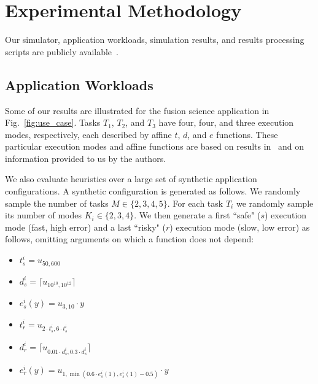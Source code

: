 \chapter{Experimental Methodology}
\label{sec:methodology}

Our simulator, application workloads, simulation results, and results processing scripts are publicly available~\cite{HIDDEN_URL}.




\section{Application Workloads}

Some of our results are illustrated for the fusion
science application in Fig.~\ref{fig:use_case}. Tasks
$T_1$, $T_2$, and $T_3$ have four, four, and three execution modes, respectively,
each described by affine $t$, $d$, and $e$ functions.  These particular
execution modes and affine functions are based on results in~\cite{9912722}
and on information provided to us by the authors.  

We also evaluate heuristics over a large set of synthetic application
configurations.  A synthetic configuration is generated as follows. We
randomly sample the number of tasks $M{\in}\{2,3,4,5\}$. For each task
$T_i$ we randomly sample its number of modes $K_i{\in}\{2, 3, 4\}$. We then
generate a first ``safe" ($s$) execution mode (fast, high error)
and a last ``risky" ($r$) execution mode (slow, low error) as
follows, omitting arguments on which a function does not depend:

\begin{minipage}{0.39\columnwidth}
\begin{itemize}[leftmargin=0pt, labelindent=0pt, labelsep=0.3em]
\item $t^i_s{=}u_{50, 600}$
\item $d^i_s{=}\lceil u_{10^{10}, 10^{12}} \rceil$
\item $e^i_s(y){=}u_{3, 10} \cdot y$
\end{itemize}
\end{minipage}
\begin{minipage}{0.55\columnwidth}
\begin{itemize}[leftmargin=0pt, labelindent=0pt, labelsep=0.3em]
	\item $t^i_r{=}u_{2 \cdot t^i_s , 6 \cdot t^i_s}$
	\item $d^i_r{=}\lceil u_{0.01 \cdot d^i_s, 0.3 \cdot d^i_s} \rceil$
	\item $e^i_r(y){=}u_{1, \min(0.6 \cdot e^i_s(1), e^i_s(1) - 0.5)} \cdot y$
\end{itemize}
\end{minipage}~\\

